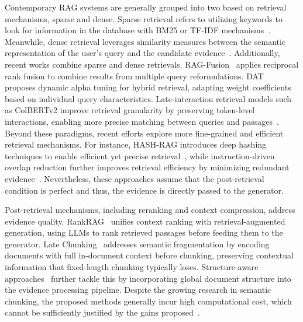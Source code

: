 Contemporary RAG systems are generally grouped into two based on retrieval mechanisms, sparse and dense.
Sparse retrieval refers to utilizing keywords to look for information in the database with BM25 or TF-IDF mechanisms~\cite{ram2023context, huly2024old}.
Meanwhile, dense retrieval leverages similarity measures between the semantic representation of the user's query and the candidate evidence~\cite{borgeaud2022improving, izacard2022few, lewis2020retrieval}.
Additionally, recent works combine sparse and dense retrievals. 
RAG-Fusion~\citep{rackauckas2024rag} applies reciprocal rank fusion to combine results from multiple query reformulations.
DAT~\citep{hsu2025dat} proposes dynamic alpha tuning for hybrid retrieval, adapting weight coefficients based on individual query characteristics.
Late-interaction retrieval models such as ColBERTv2 improve retrieval granularity by preserving token-level interactions, enabling more precise matching between queries and passages~\citep{santhanam2022colbertv2}.
Beyond these paradigms, recent efforts explore more fine-grained and efficient retrieval mechanisms. For instance, HASH-RAG introduces deep hashing techniques to enable efficient yet precise retrieval~\citep{guo2025hash}, while instruction-driven overlap reduction further improves retrieval efficiency by minimizing redundant evidence~\citep{ou2025accelerating}.
Nevertheless, these approaches assume that the post-retrieval condition is perfect and thus, the evidence is directly passed to the generator.


Post-retrieval mechanisms, including reranking and context compression, address evidence quality.
RankRAG~\citep{yu2024rankrag} unifies context ranking with retrieval-augmented generation, using LLMs to rank retrieved passages before feeding them to the generator. 
Late Chunking~\citep{gunther2024late} addresses semantic fragmentation by encoding documents with full in-document context before chunking, preserving contextual information that fixed-length chunking typically loses. 
Structure-aware approaches~\citep{zhang2026text} further tackle this by incorporating global document structure into the evidence processing pipeline. 
Despite the growing research in semantic chunking, the proposed methods generally incur high computational cost, which cannot be sufficiently justified by the gains proposed~\citep{qu2025semantic}.


